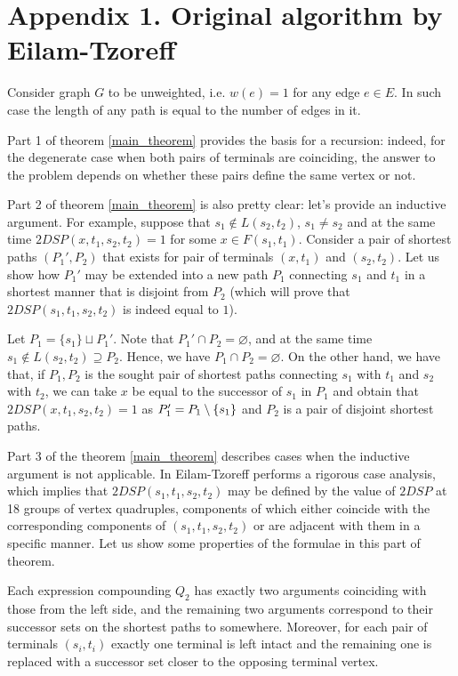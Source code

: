 \clearpage
\section{Appendix 1. Original algorithm by Eilam-Tzoreff}

Consider graph $G$ to be unweighted, i.e. $w(e) = 1$ for any edge $e \in E$. In such case the length of any path is equal to the number of edges in it.

Part 1 of theorem \ref{main_theorem} provides the basis for a recursion: indeed, for the degenerate case when both pairs of terminals are coinciding, the answer to the problem depends on whether these pairs define the same vertex or not.

Part 2 of theorem \ref{main_theorem} is also pretty clear: let's provide an inductive argument. For example, suppose that $s_1 \notin L(s_2, t_2)$, $s_1 \neq s_2$ and at the same time $2DSP(x, t_1, s_2, t_2) = 1$ for some $x \in F(s_1, t_1)$. Consider a pair of shortest paths $(P_1', P_2)$ that exists for pair of terminals $(x, t_1)$ and $(s_2, t_2)$. Let us show how $P_1'$ may be extended into a new path $P_1$ connecting $s_1$ and $t_1$ in a shortest manner that is disjoint from $P_2$ (which will prove that $2DSP(s_1, t_1, s_2, t_2)$ is indeed equal to $1$).

Let $P_1 = \{s_1\} \sqcup P_1'$. Note that $P_1' \cap P_2 = \varnothing$, and at the same time $s_1 \notin L(s_2, t_2) \supseteq P_2$. Hence, we have $P_1 \cap P_2 = \varnothing$. On the other hand, we have that, if $P_1, P_2$ is the sought pair of shortest paths connecting $s_1$ with $t_1$ and $s_2$ with $t_2$, we can take $x$ be equal to the successor of $s_1$ in $P_1$ and obtain that $2DSP(x, t_1, s_2, t_2) = 1$ as $P_1' = P_1 \setminus \{s_1\}$ and $P_2$ is a pair of disjoint shortest paths.

Part 3 of the theorem \ref{main_theorem} describes cases when the inductive argument is not applicable. In \cite{ET} Eilam-Tzoreff performs a rigorous case analysis, which implies that $2DSP(s_1, t_1, s_2, t_2)$  may be defined by the value of $2DSP$ at 18 groups of vertex quadruples, components of which either coincide with the corresponding components of $(s_1, t_1, s_2, t_2)$ or are adjacent with them in a specific manner. Let us show some properties of the formulae in this part of theorem.

\begin{proposition} \label{q2_structure}
Each expression compounding $Q_2$ has exactly two arguments coinciding with those from the left side, and the remaining two arguments correspond to their successor sets on the shortest paths to somewhere. Moreover, for each pair of terminals $(s_i, t_i)$ exactly one terminal is left intact and the remaining one is replaced with a successor set closer to the opposing terminal vertex.
\end{proposition}

